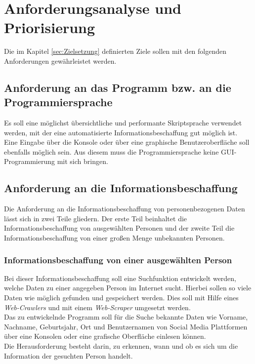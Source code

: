 
\chapter{Anforderungsanalyse und Priorisierung}  %
\label{cha:Anforderungsanalyse und Prioriesierung} %
Die im Kapitel \ref{sec:Zielsetzung} definierten Ziele sollen mit den folgenden Anforderungen gewährleistet werden.
\section{Anforderung an das Programm bzw. an die Programmiersprache}
Es soll eine möglichst übersichtliche und performante Skriptsprache verwendet werden, mit der eine automatisierte Informationsbeschaffung gut möglich ist. Eine Eingabe über die Konsole oder über eine graphische Benutzeroberfläche soll ebenfalls möglich sein. Aus diesem muss die Programmiersprache keine GUI-Programmierung mit sich bringen.
\section{Anforderung an die Informationsbeschaffung}
Die Anforderung an die Informationsbeschaffung von personenbezogenen Daten lässt sich in zwei Teile gliedern. Der erste Teil beinhaltet die Informationsbeschaffung von ausgewählten Personen und der zweite Teil die Informationsbeschaffung von einer großen Menge unbekannten Personen.
	
	\subsection{Informationsbeschaffung von einer ausgewählten Person}
	Bei dieser Informationsbeschaffung soll eine Suchfunktion entwickelt werden, welche Daten zu einer angegeben Person im Internet sucht. Hierbei sollen so viele Daten wie möglich gefunden und gespeichert werden. Dies soll mit Hilfe eines \textit{Web-Crawlers} und mit einem \textit{Web-Scraper} umgesetzt werden.\\
	Das zu entwickelnde Programm soll für die Suche bekannte Daten wie Vorname, Nachname, Geburtsjahr, Ort und Benutzernamen von Social Media Plattformen über eine Konsolen oder eine grafische Oberfläche einlesen können.\\
	Die Herausforderung besteht darin, zu erkennen, wann und ob es sich um die Information der gesuchten Person handelt.
	
